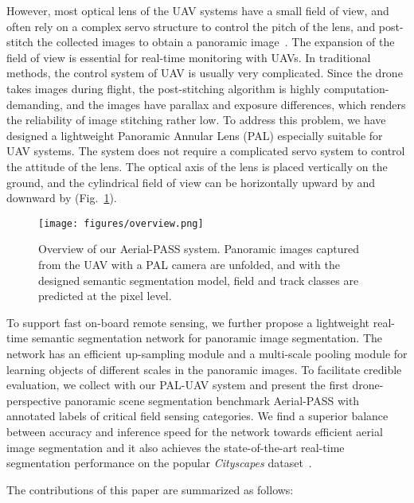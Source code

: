 \documentclass[letterpaper, 10 pt, conference]{ieeeconf}
\begin{document}
However, most optical lens of the UAV systems have a small field of view, and often rely on a complex servo structure to control the pitch of the lens, and post-stitch the collected images to obtain a  panoramic image~\cite{d2012unmanned}.
The expansion of the field of view is essential for real-time monitoring with UAVs.
In traditional methods, the control system of UAV is usually very complicated.
Since the drone takes images during flight, the post-stitching algorithm is highly computation-demanding, and the images have parallax and exposure differences, which renders the reliability of image stitching rather low.
To address this problem,
we have designed a lightweight Panoramic Annular Lens (PAL) especially suitable for UAV systems.
The system does not require a complicated servo system to control the attitude of the lens. The optical axis of the lens is placed vertically on the ground, and the cylindrical field of view can be horizontally upward by  and downward by  (Fig.~\ref{fig:overview}). 

\begin{figure}[!t]
    \centerline{\texttt{[image: figures/overview.png]}}
    \caption{Overview of our Aerial-PASS system. Panoramic images captured from the UAV with a PAL camera are unfolded, and with the designed semantic segmentation model, field and track classes are predicted at the pixel level.}
    \label{fig:overview}
\end{figure}

To support fast on-board remote sensing, we further propose a lightweight real-time semantic segmentation network for panoramic image segmentation.
The network has an efficient up-sampling module and a multi-scale pooling module for learning objects of different scales in the panoramic images. To facilitate credible evaluation, we collect with our PAL-UAV system and present the first drone-perspective panoramic scene segmentation benchmark Aerial-PASS with annotated labels of critical field sensing categories.
We find a superior balance between accuracy and inference speed for the network towards efficient aerial image segmentation and it also achieves the state-of-the-art real-time segmentation performance on the popular \emph{Cityscapes} dataset~\cite{Cordts2016Cityscapes}. 

The contributions of this paper are summarized as follows:
\end{document}

